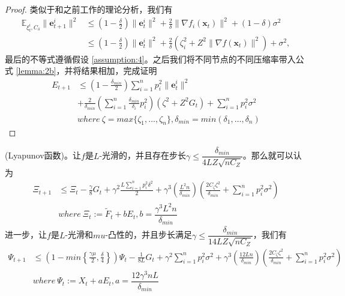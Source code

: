 \begin{proof}
类似于和之前工作\cite{stich2020communication,stich2019error}的理论分析，我们有
\begin{equation}
\begin{split}
    \mathbb{E}_{\xi_t^i,C_\delta}\lVert \textbf{e}_{t+1}^i\rVert^2 
    &\leq (1-\frac{\delta}{2})\lVert \textbf{e}_{t}^i\rVert^2+\frac{2}{\delta}\lVert\nabla f_i(\textbf{x}_t)\rVert^2+(1-\delta)\sigma^2 \\
    &\leq (1-\frac{\delta}{2})\lVert \textbf{e}_{t}^i\rVert^2+\frac{2}{\delta}(\zeta_i^2+Z^2\lVert\nabla f(\textbf{x}_t)\rVert^2)+\sigma^2,
\label{lemma:2b}
\end{split}
\end{equation}
最后的不等式遵循假设 \ref{assumption:4}。之后我们将不同节点的不同压缩率带入公式 \ref{lemma:2b}，并将结果相加，完成证明
\begin{equation}
\begin{split}
    E_{t+1} &\leq (1-\frac{\delta_{min}}{2})\sum_{i=1}^n p_i^2 \lVert \textbf{e}_{t}^i\rVert^2\\&+\frac{2}{\delta_{min}}(\sum_{i=1}^n\frac{\delta_{min}}{\delta_i}p_i^2) (\zeta ^2+Z^2 G_t)+\sum_{i=1}^n p_i^2 \sigma^2 \nonumber\\
    &where~\zeta=max\{\zeta_1,\ldots,\zeta_n\}, \delta_{min} = min(\delta_1,\ldots,\delta_n)
\end{split}
\end{equation}
\end{proof}

\begin{lemma}
(Lyapunov函数)。让$f$是$L$-光滑的，并且存在步长$\gamma\leq\dfrac{\delta_{min}}{4L Z\sqrt{n C_Z }}$。那么就可以认为
\begin{eqnarray}
\label{lemma:3a}
\Xi_{t+1}&\leq \Xi_{t} - \frac{\gamma}{8}G_t + \gamma ^2 \frac{L \sum_{i=1}^n p_i^2 \delta ^2}{2}+ \gamma ^3 \left(\frac{L^2 n  }{\delta_{min}}\right)\left(\frac{2 C_{\zeta} \zeta^2}{\delta_{min}}+\sum_{i=1}^n p_i^2\sigma^2\right) \nonumber\\
&where~ \Xi_t:= \tilde{F}_t+b E_t, b= \dfrac{\gamma^3 L^2 n}{\delta_{min}}
\label{lemma:4.3.1}
\end{eqnarray}
进一步，让$f$是$L$-光滑和$mu$-凸性的，并且步长满足$\gamma \leq \dfrac{\delta_{min}}{14 L Z \sqrt{ n C_{Z}}}$，我们有
\begin{eqnarray}
\label{lemma:3b}
    \Psi_{t+1}&\leq \left(1-min\left\{\frac{\gamma \mu}{2},\frac{\delta}{4}\right\}\right)\Psi_{t} - \frac{1}{8L}G_t+\gamma ^2\sum_{i=1}^n p_i^2 \sigma ^2 + \gamma ^3\left(\frac{12 L n}{\delta_{min}}\right)\left (\frac{2 C_{\zeta} \zeta ^2}{\delta_{min}}+\sum_{i=1}^n p_i^2\sigma^2\right) \nonumber\\
    &where~\Psi_t := X_t +a E_t,a = \dfrac{12\gamma^3 n L}{\delta_{min}}
\label{lemma:4.3.2}
\end{eqnarray}
\end{lemma}

